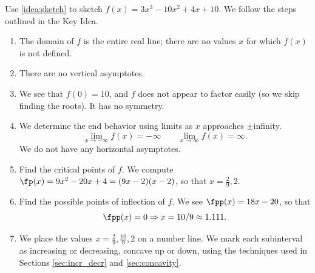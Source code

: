 \begin{example}\label{ex_sketch1}
Use \autoref{idea:sketch} to sketch $f(x) = 3x^3-10x^2+4x+10$.
\solution
We follow the steps outlined in the Key Idea.
\begin{enumerate}
	\item	The domain of $f$ is the entire real line; there are no values $x$ for which $f(x)$ is not defined.
	\item	There are no vertical asymptotes.
	\item	We see that $f(0)=10$, and $f$ does not appear to factor easily (so we skip finding the roots).  It has no symmetry.
	\item	We determine the end behavior using limits as $x$ approaches $\pm$infinity.			\[\lim_{x\to-\infty}f(x)=-\infty\qquad\lim_{x\to\infty}f(x)=\infty.\]
		We do not have any horizontal asymptotes.
	\item	Find the critical points of $f$. We compute $\fp(x) = 9x^2-20x+4=(9x-2)(x-2)$, so that $x=\frac29,2$.
	\item	Find the possible points of inflection of $f$. We see $\fpp(x) = 18x-20$, so that
	\[\fpp(x) = 0 \Rightarrow x= 10/9 \approx 1.111.\]
	\item	We place the values $x=\frac29,\frac{10}9,2$ on a number line. We mark each subinterval as increasing or decreasing, concave up or down, using the techniques used in Sections \ref{sec:incr_decr} and \ref{sec:concavity}.


\end{enumerate}
\end{example}
